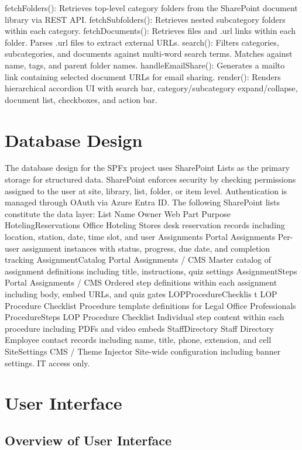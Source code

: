 \documentclass[12pt]{article}
\begin{document}
fetchFolders(): Retrieves top-level category folders from the SharePoint document library via REST API. fetchSubfolders(): Retrieves nested subcategory folders within each category. fetchDocuments(): Retrieves files and .url links within each folder. Parses .url files to extract external URLs. search(): Filters categories, subcategories, and documents against multi-word search terms. Matches against name, tags, and parent folder names. handleEmailShare(): Generates a mailto link containing selected document URLs for email sharing. render(): Renders hierarchical accordion UI with search bar, category/subcategory expand/collapse, document list, checkboxes, and action bar.

\section{Database Design}

The database design for the SPFx project uses SharePoint Lists as the primary storage for structured data. SharePoint enforces security by checking permissions assigned to the user at site, library, list, folder, or item level. Authentication is managed through OAuth via Azure Entra ID. The following SharePoint lists constitute the data layer: List Name Owner Web Part Purpose HotelingReservations Office Hoteling Stores desk reservation records including location, station, date, time slot, and user Assignments Portal Assignments Per-user assignment instances with status, progress, due date, and completion tracking AssignmentCatalog Portal Assignments / CMS Master catalog of assignment definitions including title, instructions, quiz settings AssignmentSteps Portal Assignments / CMS Ordered step definitions within each assignment including body, embed URLs, and quiz gates LOPProcedureChecklis t LOP Procedure Checklist Procedure template definitions for Legal Office Professionals ProcedureSteps LOP Procedure Checklist Individual step content within each procedure including PDFs and video embeds StaffDirectory Staff Directory Employee contact records including name, title, phone, extension, and cell SiteSettings CMS / Theme Injector Site-wide configuration including banner settings. IT access only.

\section{User Interface}

\subsection{Overview of User Interface}
\end{document}
